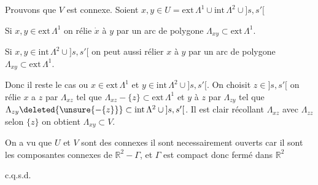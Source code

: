 Prouvons que $V$ est connexe. Soient $x,y\in U=\mathrm{ext}\,\Lambda^{1}\cup\mathrm{int}\,\Lambda^{2}\cup{]s,s'[}$

Si $x,y\in\mathrm{ext}\,\Lambda^{1}$ on rélie $\dot{x}$ à $y$ par un arc de polygone $\Lambda_{xy}\subset\mathrm{ext}\,\Lambda^{1}$.

Si $x,y\in\mathrm{int}\,\Lambda^{2}\cup{]s,s'[}$ on peut aussi rélier $x$ à $y$ par un arc de polygone $\Lambda_{xy}\subset\mathrm{ext}\,\Lambda^{1}$.

Donc il reste le cas ou $x\in\mathrm{ext}\,\Lambda^{1}$ et $y\in\mathrm{int}\,\Lambda^{2}\cup{]s,s'[}$. On choisit $z\in{]s,s'[}$ on rélie $x$ a $z$ par $\Lambda_{xz}$ tel que $\Lambda_{xz}-\{z\}\subset\mathrm{ext}\,\Lambda^{1}$ et $y$ à $z$ par $\Lambda_{zy}$ tel que $\Lambda_{zy}\deleted{\unsure{-\{z\}}}\subset\mathrm{int}\,\Lambda^{2}\cup{]s,s'[}$. Il est clair  récollant $\Lambda_{xz}$ avec $\Lambda_{zz}$ selon $\{z\}$ on obtient $\Lambda_{xy}\subset V$.

On a vu que $U$ et $V$ sont des connexes il sont necessairement ouverts car il sont les composantes connexes de $\mathbb{R}^{2}-\Gamma$, et $\Gamma$ est compact donc fermé dans $\mathbb{R}^{2}$\unsure{)|,|;}

\hfill c.q.s.d.
